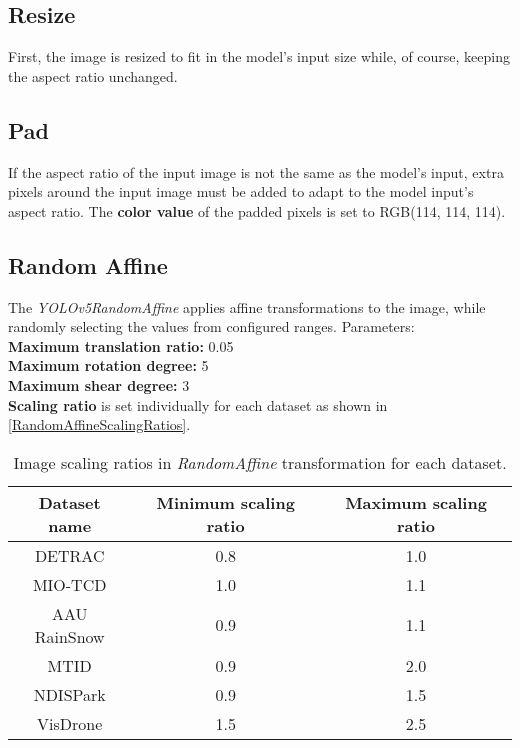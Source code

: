 
\subsection*{Resize}

First, the image is resized to fit in the model's input size while, of course,
keeping the aspect ratio unchanged.

\subsection*{Pad}

\label{PadTransformation}
If the aspect ratio of the input image is not the same as the model's input, extra pixels around the input image must be added
to adapt to the model input's aspect ratio. The \textbf{color value} of the padded pixels is set to RGB(114, 114, 114).

\subsection*{Random Affine}

The \textit{YOLOv5RandomAffine} applies affine transformations to the image,
while randomly selecting the values from configured ranges. Parameters:\\
\textbf{Maximum translation ratio:} 0.05 \\
\textbf{Maximum rotation degree:} 5 \\
\textbf{Maximum shear degree:} 3 \\
\textbf{Scaling ratio} is set individually for each dataset as shown in \autoref{RandomAffineScalingRatios}.

\begin{table}[h]
\centering
\label{RandomAffineScalingRatios}
\begin{tabular}{|c|c|c|}
    \hline
    Dataset name & Minimum scaling ratio & Maximum scaling ratio \\
    \hline
    DETRAC       & 0.8 & 1.0 \\
    MIO-TCD      & 1.0 & 1.1 \\
    AAU RainSnow & 0.9 & 1.1 \\
    MTID         & 0.9 & 2.0 \\
    NDISPark     & 0.9 & 1.5 \\
    VisDrone     & 1.5 & 2.5 \\
    \hline
\end{tabular}
\caption{Image scaling ratios in \textit{RandomAffine} transformation for each dataset.}
\end{table}

